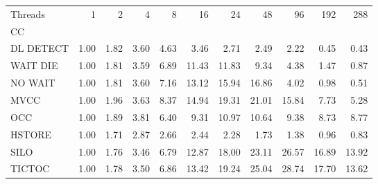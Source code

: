 \begin{tabular}{lrrrrrrrrrr}
\toprule
Threads &  1   &  2   &  4   &  8   &   16  &   24  &   48  &   96  &   192 &   288 \\
CC        &      &      &      &      &       &       &       &       &       &       \\
\midrule
DL DETECT & 1.00 & 1.82 & 3.60 & 4.63 &  3.46 &  2.71 &  2.49 &  2.22 &  0.45 &  0.43 \\
WAIT DIE  & 1.00 & 1.81 & 3.59 & 6.89 & 11.43 & 11.83 &  9.34 &  4.38 &  1.47 &  0.87 \\
NO WAIT   & 1.00 & 1.81 & 3.60 & 7.16 & 13.12 & 15.94 & 16.86 &  4.02 &  0.98 &  0.51 \\
MVCC      & 1.00 & 1.96 & 3.63 & 8.37 & 14.94 & 19.31 & 21.01 & 15.84 &  7.73 &  5.28 \\
OCC       & 1.00 & 1.89 & 3.81 & 6.40 &  9.31 & 10.97 & 10.64 &  9.38 &  8.73 &  8.77 \\
HSTORE    & 1.00 & 1.71 & 2.87 & 2.66 &  2.44 &  2.28 &  1.73 &  1.38 &  0.96 &  0.83 \\
SILO      & 1.00 & 1.76 & 3.46 & 6.79 & 12.87 & 18.00 & 23.11 & 26.57 & 16.89 & 13.92 \\
TICTOC    & 1.00 & 1.78 & 3.50 & 6.86 & 13.42 & 19.24 & 25.04 & 28.74 & 17.70 & 13.62 \\
\bottomrule
\end{tabular}
